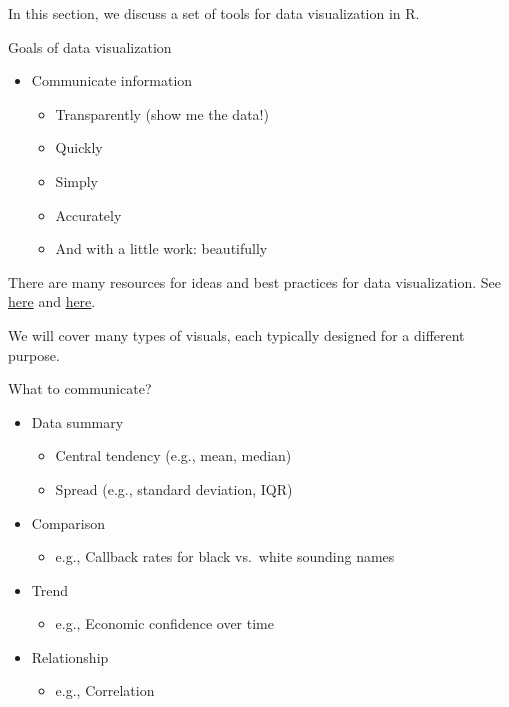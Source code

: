 \documentclass[
  letterpaper,
  DIV=11,
  numbers=noendperiod]{scrreprt}
\providecommand{\tightlist}{%
  \setlength{\itemsep}{0pt}\setlength{\parskip}{0pt}}\usepackage{longtable,booktabs,array}
\begin{document}
In this section, we discuss a set of tools for data visualization in R.

Goals of data visualization

\begin{itemize}
\tightlist
\item
  Communicate information

  \begin{itemize}
  \tightlist
  \item
    Transparently (show me the data!)
  \item
    Quickly
  \item
    Simply
  \item
    Accurately
  \item
    And with a little work: beautifully
  \end{itemize}
\end{itemize}

There are many resources for ideas and best practices for data
visualization. See
\href{https://www.tableau.com/learn/articles/best-data-visualization-blogs}{here}
and \href{https://serialmentor.com/dataviz/index.html}{here}.

We will cover many types of visuals, each typically designed for a
different purpose.

What to communicate?

\begin{itemize}
\tightlist
\item
  Data summary

  \begin{itemize}
  \tightlist
  \item
    Central tendency (e.g., mean, median)
  \item
    Spread (e.g., standard deviation, IQR)
  \end{itemize}
\item
  Comparison

  \begin{itemize}
  \tightlist
  \item
    e.g., Callback rates for black vs.~white sounding names
  \end{itemize}
\item
  Trend

  \begin{itemize}
  \tightlist
  \item
    e.g., Economic confidence over time
  \end{itemize}
\item
  Relationship

  \begin{itemize}
  \tightlist
  \item
    e.g., Correlation
  \end{itemize}
\end{itemize}
\end{document}
